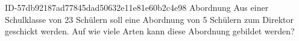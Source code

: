 \begin{exercise}
      {ID-57db92187ad77845dad50632e11e81e60b2c4e98}
      {Abordnung}
  \ifproblem\problem
    Aus einer Schulklasse von 23 Schülern soll eine Abordnung von 5 Schülern
    zum Direktor geschickt werden. Auf wie viele Arten kann diese Abordnung
    gebildet werden?
  \fi
\end{exercise}
